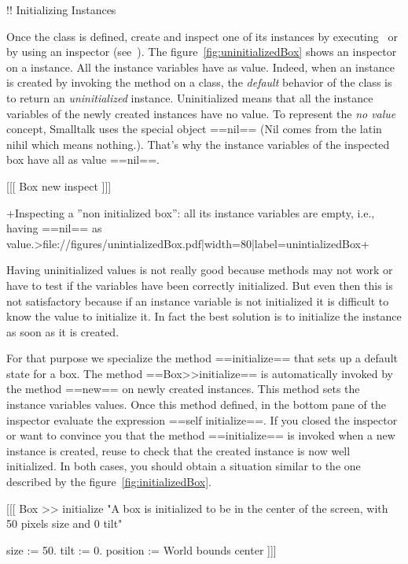 !! Initializing Instances

Once the class is defined, create and inspect one of its instances by
executing~ or by using an inspector (see~).  The
figure~\ref{fig:uninitializedBox} shows an inspector on a 
instance.  All the instance variables have  as
value.  Indeed, when an instance is created by invoking the method
 on a class, the \emph{default} behavior of the
class is to return an \emph{uninitialized}
instance.  Uninitialized means that all the
instance variables of the newly created instances have no value.  To
represent the \emph{no value} concept, Smalltalk  uses the special object 
==nil== (Nil comes from the latin nihil which means
nothing.). 
That's why the instance variables of the inspected box have all as value ==nil==.

[[[
Box new inspect
]]]

+Inspecting a ''non initialized box'': all its instance variables 
are empty, i.e., having ==nil== as value.>file://figures/unintializedBox.pdf|width=80|label=unintializedBox+ 


Having uninitialized values is not really good because methods may not
work or have to test if the variables have been correctly initialized. 
But even then this is not satisfactory because if an instance variable
is not initialized it is difficult to know the value to initialize it. 
In fact the best solution is to initialize the instance as soon as it
is created.  



For that purpose we specialize the method ==initialize== that sets up
a default state for a box.  The method ==Box>>initialize== is
automatically invoked by the method ==new== on newly created
instances.  This method sets the instance variables values.  Once this
method defined, in the bottom pane of the inspector evaluate the expression 
==self initialize==. If you closed the inspector or want to convince you that the method ==initialize== is invoked when a new instance is created,  reuse  to check that the created
instance is now well initialized. In both cases, you should obtain a situation 
similar to the one described by the figure~\ref{fig:initializedBox}.

[[[
Box >> initialize
	"A box is initialized to be in the center of the screen, with 
	50 pixels size and 0 tilt"
	
	size := 50.
	tilt := 0.
	position := World bounds center
]]]

